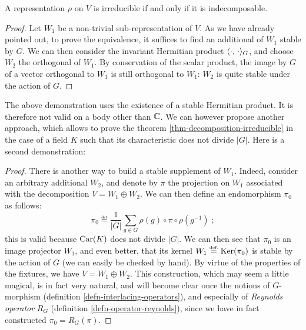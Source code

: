  
\begin{thm}
\label{thm-decomposition-irreducible}
   A representation $ \rho $ on $V$ is irreducible if and only if it is indecomposable.
\end{thm}
\begin{proof}
  Let $ W_1 $ be a non-trivial sub-representation of $V$. As we have already pointed out, to prove the equivalence, it suffices to find an additional of $ W_1 $ stable by $G$. We can then consider the invariant Hermitian product $ \langle \cdot,\,\cdot\rangle_G $, and choose $ W_2 $ the orthogonal of $ W_1 $. By conservation of the scalar product, the image by $G$ of a vector orthogonal to $ W_1 $ is still orthogonal to $ W_1 $: $ W_2 $ is quite stable under the action of $G$.
\end{proof}
 
 
\begin{rem}
The above demonstration uses the existence of a stable Hermitian product. It is therefore not valid on a body other than $ \mathbb{C} $. We can however propose another approach, which allows to prove the theorem \ref{thm-decomposition-irreducible} in the case of a field $K$ such that its characteristic does not divide $ |G| $. Here is a second demonstration:
\end{rem}

\begin{proof}
There is another way to build a stable supplement of $ W_1 $. Indeed, consider an arbitrary additional $ W_2 $, and denote by $ \pi $ the projection on $ W_1 $ associated with the decomposition $ V = W_1 \oplus W_2 $. We can then define an endomorphism $ \pi_0 $ as follows:
\begin{equation*}
\pi_0 \eqdef \frac{1}{|G|} \sum_{g \in G}{\rho (g) \circ \pi \circ \rho (g^{-1})} \; ;
\end{equation*}
this is valid because $ \operatorname{Car} (K) $ does not divide $ |G| $. We can then see that $ \pi_0 $ is an image projector $ W_1 $, and even better, that its kernel $ W_1 \stackrel{\mbox{\upshape\tiny def.}}{=} \operatorname{Ker} (\pi_0) $ is stable by the action of $G$ (we can easily be checked by hand). By virtue of the properties of the fixtures, we have $ V = W_1 \oplus W_2 $. This construction, which may seem a little magical, is in fact very natural, and will become clear once the notions of $G$-morphism (definition \ref{defn-interlacing-operators}), and especially of \textit{ Reynolds operator} $ R_G $ (definition \ref{defn-operator-reynolds}), since we have in fact constructed $ \pi_0 = R_G (\pi) $.
\end{proof}
 
